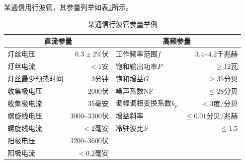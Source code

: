 某通信用行波管，其参量列举如表\ref{tab:11-1}所示。

\begin{table} 
	\caption{某通信行波管参量举例}
	\label{tab:11-1}
	\begin{tabular}{lrlr}
		\toprule
		\multicolumn{2}{c}{直流参量} & \multicolumn{2}{c}{高频参量}   \\ 
	\midrule
		灯丝电压	& $ 6.3\pm 2\%伏 $ &工作频率范围$ f $  & 3.4\textasciitilde4.2千兆赫 \\ 
		灯丝电流	& $ <1 $安 & 饱和输出功率$ P $ & $ \ge 12 $瓦 \\ 
		灯丝最少预热时间	& 3分钟 & 饱和增益$ G $ & $ \ge 35 $分贝 \\ 
		收集极电压	&2000伏  & 噪声系数NF & $ \le 28 $分贝 \\ 
		收集极电流	& 35毫安 &调幅调相变换系数$ k_p $  & $ <3 $度/分贝 \\ 
		螺旋线电压	&3000\textasciitilde3300伏  & 增益斜率 & $ \le 0.01$分贝/兆赫  \\ 
		螺旋线电流	&  $ <2 $毫安&冷驻波比$ S $  &  $ \le 1.5 $\\ 
		阳极电压	& 3200\textasciitilde3600伏 &  &  \\
		阳极电流& $ <0.2 $毫安& & \\
		\bottomrule 
	\end{tabular} 
\end{table}




